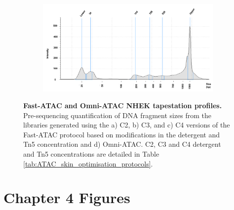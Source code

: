\begin{figure}[htbp]
\begin{subfigure}{0.60\textwidth}
\caption{\textbf{}} %
\end{subfigure}
\begin{subfigure}{0.60\textwidth}
\centering
\includegraphics[width=\textwidth]{./Appendix/pdfs/Chapter3/Omni_ATAC_NHEK_Rep1_tapestation}
\caption{\textbf{}} %
\end{subfigure}
\hfill
\caption[Fast-ATAC and Omni-ATAC NHEK tapestation profiles.]{\textbf{Fast-ATAC and Omni-ATAC NHEK tapestation profiles.} Pre-sequencing quantification of DNA fragment sizes from the libraries generated  using the a) C2, b) C3, and c) C4 versions of the Fast-ATAC protocol based on modifications in the detergent and Tn5 concentration and d) Omni-ATAC. C2, C3 and C4 detergent and Tn5 concentrations are detailed in Table \ref{tab:ATAC_skin_optimisation_protocols}.}
\label{figure:NHEK_tapestation}
\end{figure}

\section{Chapter 4 Figures}

